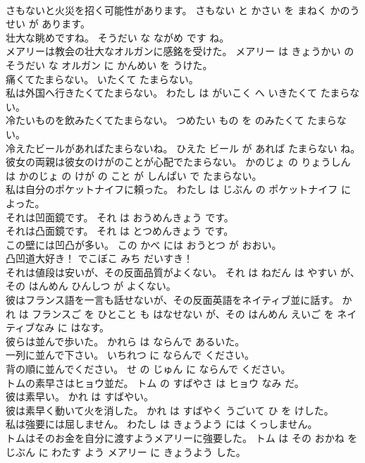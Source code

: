 \documentclass[8pt]{extreport}
\begin{document}
\begin{CJK}{UTF8}{min}
\\	さもないと火災を招く可能性があります。	さもない と かさい を まねく かのうせい が あります。	
\\	壮大な眺めですね。	そうだい な ながめ です ね。	
\\	メアリーは教会の壮大なオルガンに感銘を受けた。	メアリー は きょうかい の そうだい な オルガン に かんめい を うけた。	
\\	痛くてたまらない。	いたくて たまらない。	
\\	私は外国へ行きたくてたまらない。	わたし は がいこく へ いきたくて たまらない。	
\\	冷たいものを飲みたくてたまらない。	つめたい もの を のみたくて たまらない。	
\\	冷えたビールがあればたまらないね。	ひえた ビール が あれば たまらない ね。	
\\	彼女の両親は彼女のけがのことが心配でたまらない。	かのじょ の りょうしん は かのじょ の けが の こと が しんぱい で たまらない。	
\\	私は自分のポケットナイフに頼った。	わたし は じぶん の ポケットナイフ に よった。	
\\	それは凹面鏡です。	それ は おうめんきょう です。	
\\	それは凸面鏡です。	それ は とつめんきょう です。	
\\	この壁には凹凸が多い。	この かべ には おうとつ が おおい。	
\\	凸凹道大好き！	でこぼこ みち だいすき！	
\\	それは値段は安いが、その反面品質がよくない。	それ は ねだん は やすい が、その はんめん ひんしつ が よくない。	
\\	彼はフランス語を一言も話せないが、その反面英語をネイティブ並に話す。	かれ は フランスご を ひとこと も はなせない が、その はんめん えいご を ネイティブなみ に はなす。	
\\	彼らは並んで歩いた。	かれら は ならんで あるいた。	
\\	一列に並んで下さい。	いちれつ に ならんで ください。	
\\	背の順に並んでください。	せ の じゅん に ならんで ください。	
\\	トムの素早さはヒョウ並だ。	トム の すばやさ は ヒョウ なみ だ。	
\\	彼は素早い。	かれ は すばやい。	
\\	彼は素早く動いて火を消した。	かれ は すばやく うごいて ひ を けした。	
\\	私は強要には屈しません。	わたし は きょうよう には くっしません。	
\\	トムはそのお金を自分に渡すようメアリーに強要した。	トム は その おかね を じぶん に わたす よう メアリー に きょうよう した。	

\end{CJK}
\end{document}
